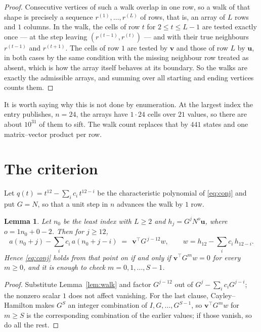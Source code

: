 \documentclass[11pt,a4paper]{article}
\theoremstyle{plain}
\newtheorem{lemma}[theorem]{Lemma}
\theoremstyle{definition}
\begin{document}
\begin{proof}
Consecutive vertices of such a walk overlap in one row, so a walk of that shape is
precisely a sequence $r^{(1)},\dots,r^{(L)}$ of rows, that is, an array of $L$ rows
and $1$ columns. In the walk, the cells of row $t$ for $2\le t\le L-1$ are tested
exactly once --- at the step leaving $(r^{(t-1)},r^{(t)})$ --- and with their true
neighbours $r^{(t-1)}$ and $r^{(t+1)}$. The cells of row $1$ are tested by
$\mathbf{v}$ and those of row $L$ by $\mathbf{u}$, in both cases by the same condition
with the missing neighbour row treated as absent, which is how the array itself behaves at
its boundary. So the walks are exactly the admissible arrays, and summing over all starting
and ending vertices counts them.
\end{proof}


It is worth saying why this is not done by enumeration. At the largest index the entry
publishes, $n=24$, the arrays have $1\cdot24$ cells over
$21$ values, so there are about $10^{31}$ of them to sift. The
walk count replaces that by $441$ states and one matrix--vector product per row.
\section{The criterion}

Let $q(t)=t^{12}-\sum_i c_i\,t^{12-i}$ be the characteristic polynomial of
\eqref{eq:conj} and put $G=N$, so that a unit step in $n$ advances the walk by
$1$ row.

\begin{lemma}\label{lem:crit}
Let $n_0$ be the least index with $L\ge2$ and $h_j=G^{j}N^{o}\mathbf{u}$, where
$o=1n_0+0-2$. Then for $j\ge12$,
\[
a(n_0+j)-\sum_i c_i\,a(n_0+j-i)\;=\;\,\mathbf{v}^{\!\top}G^{\,j-12}w,
\qquad w=h_{12}-\sum_i c_i\,h_{12-i} .
\]
Hence \eqref{eq:conj} holds from that point on if and only if
$\mathbf{v}^{\!\top}G^{m}w=0$ for every $m\ge0$, and it is enough to check
$m=0,1,\dots,S-1$.
\end{lemma}

\begin{proof}
Substitute Lemma~\ref{lem:walk} and factor $G^{j-12}$ out of
$G^{j}-\sum_ic_iG^{j-i}$; the nonzero scalar $1$ does not affect
vanishing. For the last clause, Cayley--Hamilton makes $G^{S}$ an integer combination of
$I,G,\dots,G^{S-1}$, so $\mathbf{v}^{\!\top}G^{m}w$ for $m\ge S$ is the corresponding
combination of the earlier values; if those vanish, so do all the rest.
\end{proof}
\end{document}
